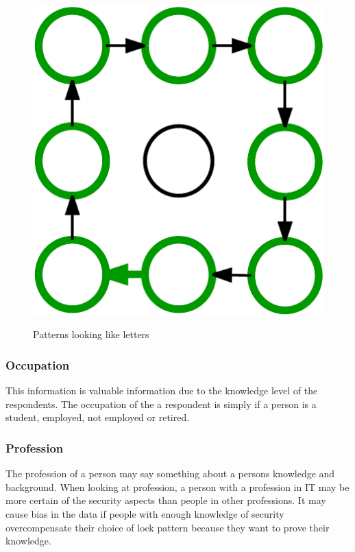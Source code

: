 \begin{figure}[H]
{            \includegraphics[scale=0.20]{pics/letterO.png}
          }
          \caption{Patterns looking like letters}
          \label{fig:letters}
        \end{figure}

      \subsubsection*{Occupation} 
      This information is valuable information due to the knowledge level of the respondents. The occupation of the a respondent is simply if a person is a student, employed, not employed or retired.

      \subsubsection*{Profession} 
      The profession of a person may say something about a persons knowledge and background. When looking at profession, a person with a profession in IT may be more certain of the security aspects than people in other professions. It may cause bias in the data if people with enough knowledge of security overcompensate their choice of lock pattern because they want to prove their knowledge.  
      

